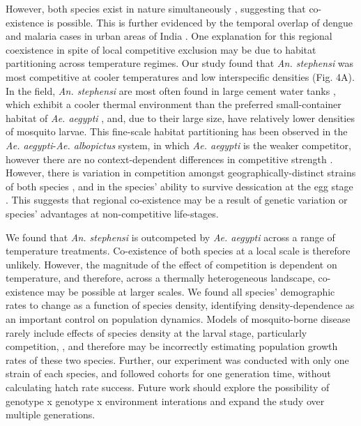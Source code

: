 \documentclass[12pt,]{article}
\begin{document}
However, both species exist in nature simultaneously
\citep{thomas2016, vikram2015}, suggesting that co-existence is
possible. This is further evidenced by the temporal overlap of dengue
and malaria cases in urban areas of India
\citep{telle2016, santos-vega2016a}. One explanation for this regional
coexistence in spite of local competitive exclusion may be due to
habitat partitioning across temperature regimes. Our study found that
\emph{An. stephensi} was most competitive at cooler temperatures and low
interspecific densities (Fig. 4A). In the field, \emph{An. stephensi}
are most often found in large cement water tanks \citep{thomas2016},
which exhibit a cooler thermal environment than the preferred
small-container habitat of \emph{Ae. aegypti} \citep{cator2013}, and,
due to their large size, have relatively lower densities of mosquito
larvae. This fine-scale habitat partitioning has been observed in the
\emph{Ae. aegypti}-\emph{Ae. albopictus} system, in which \emph{Ae.
aegypti} is the weaker competitor, however there are no
context-dependent differences in competitive strength
\citep{juliano2004}. However, there is variation in competition amongst
geographically-distinct strains of both species \citep{leisnham2010},
and in the species' ability to survive dessication at the egg stage
\citep{juliano2002}. This suggests that regional co-existence may be a
result of genetic variation or species' advantages at non-competitive
life-stages.

We found that \emph{An. stephensi} is outcompeted by \emph{Ae. aegypti}
across a range of temperature treatments. Co-existence of both species
at a local scale is therefore unlikely. However, the magnitude of the
effect of competition is dependent on temperature, and therefore, across
a thermally heterogeneous landscape, co-existence may be possible at
larger scales. We found all species' demographic rates to change as a
function of species density, identifying density-dependence as an
important control on population dynamics. Models of mosquito-borne
disease rarely include effects of species density at the larval stage,
particularly competition, \citep{reiner2013}, and therefore may be
incorrectly estimating population growth rates of these two species.
Further, our experiment was conducted with only one strain of each
species, and followed cohorts for one generation time, without
calculating hatch rate success. Future work should explore the
possibility of genotype x genotype x environment interations and expand
the study over multiple generations.




\newpage
\singlespacing
\renewcommand\refname{References}

\end{document}
